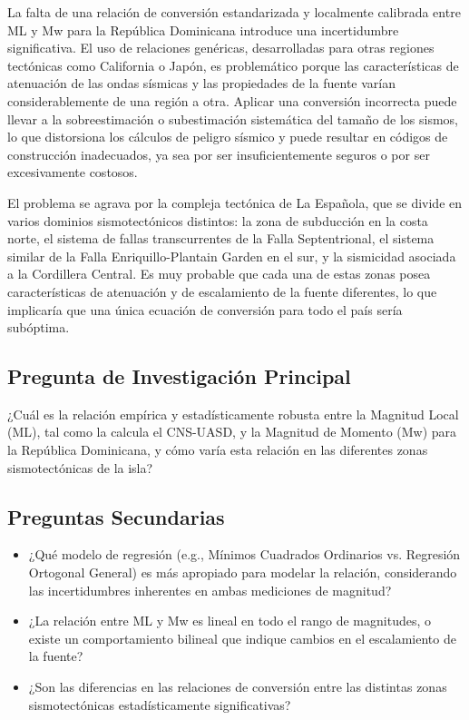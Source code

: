 \documentclass[12pt,a4paper]{article}
\begin{document}
La falta de una relación de conversión estandarizada y localmente calibrada entre ML y Mw para la República Dominicana introduce una incertidumbre significativa. El uso de relaciones genéricas, desarrolladas para otras regiones tectónicas como California o Japón, es problemático porque las características de atenuación de las ondas sísmicas y las propiedades de la fuente varían considerablemente de una región a otra. Aplicar una conversión incorrecta puede llevar a la sobreestimación o subestimación sistemática del tamaño de los sismos, lo que distorsiona los cálculos de peligro sísmico y puede resultar en códigos de construcción inadecuados, ya sea por ser insuficientemente seguros o por ser excesivamente costosos.

El problema se agrava por la compleja tectónica de La Española, que se divide en varios dominios sismotectónicos distintos: la zona de subducción en la costa norte, el sistema de fallas transcurrentes de la Falla Septentrional, el sistema similar de la Falla Enriquillo-Plantain Garden en el sur, y la sismicidad asociada a la Cordillera Central. Es muy probable que cada una de estas zonas posea características de atenuación y de escalamiento de la fuente diferentes, lo que implicaría que una única ecuación de conversión para todo el país sería subóptima.

\subsection*{Pregunta de Investigación Principal}
¿Cuál es la relación empírica y estadísticamente robusta entre la Magnitud Local (ML), tal como la calcula el CNS-UASD, y la Magnitud de Momento (Mw) para la República Dominicana, y cómo varía esta relación en las diferentes zonas sismotectónicas de la isla?

\subsection*{Preguntas Secundarias}
\begin{itemize}
    \item ¿Qué modelo de regresión (e.g., Mínimos Cuadrados Ordinarios vs. Regresión Ortogonal General) es más apropiado para modelar la relación, considerando las incertidumbres inherentes en ambas mediciones de magnitud?
    \item ¿La relación entre ML y Mw es lineal en todo el rango de magnitudes, o existe un comportamiento bilineal que indique cambios en el escalamiento de la fuente?
    \item ¿Son las diferencias en las relaciones de conversión entre las distintas zonas sismotectónicas estadísticamente significativas?
\end{itemize}
\end{document}
